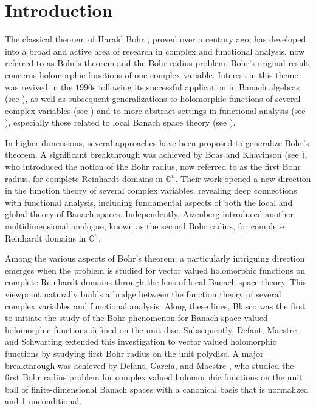 \documentclass[a4paper,11pt, reqno]{amsart}
\theoremstyle{definition}
\newcounter {own}
\begin{document}
	\section{Introduction}\label{section-1}
	The classical theorem of Harald Bohr \cite{Bohr-1914}, proved over a century ago, has developed into a broad and active area of research in complex and functional analysis, now referred to as Bohr’s theorem and the Bohr radius problem. Bohr's original result concerns holomorphic functions of one complex variable. Interest in this theme was revived in the $1990$s following its successful application in Banach algebras (see \cite{Dixon & BLMS & 1995}), as well as subsequent generalizations to holomorphic functions of several complex variables (see \cite{boas-1997,aizn-2000a}) and to more abstract settings in functional analysis (see \cite{aizn-2000b}), especially those related to local Banach space theory (see \cite{defant-2003}).
\vspace{1mm}

	In higher dimensions, several approaches have been proposed to generalize Bohr’s theorem. A significant breakthrough was achieved by Boas and Khavinson (see \cite{boas-1997}), who introduced the notion of the Bohr radius, now referred to as the first Bohr radius, for complete Reinhardt domains in 
	$\mathbb{C}^n$. Their work opened a new direction in the function theory of several complex variables, revealing deep connections with functional analysis, including fundamental aspects of both the local and global theory of Banach spaces. Independently, Aizenberg \cite{aizn-2000a} introduced another multidimensional analogue, known as the second Bohr radius, for complete Reinhardt domains in $\mathbb{C}^n$. 
	\par		
	Among the various aspects of Bohr's theorem, a particularly intriguing direction emerges when the problem is studied for vector valued holomorphic functions on complete Reinhardt domains through the lens of local Banach space theory. This viewpoint naturally builds a bridge between the function theory of several complex variables and functional analysis. Along these lines, Blasco \cite{Blasco-OTAA-2010,Blasco-Collect-2017} was the first to initiate the study of the Bohr phenomenon for Banach space valued holomorphic functions defined on the unit disc. Subsequently, Defant, Maestre, and Schwarting \cite{defant-2011} extended this investigation to vector valued holomorphic functions by studying first Bohr radius on the unit polydisc. A major breakthrough was achieved by Defant, Garc\'{i}a, and Maestre \cite{defant-2003}, who studied the first Bohr radius problem for complex valued holomorphic functions on the unit ball of finite-dimensional Banach spaces with a canonical basis that is normalized and 1-unconditional. 
	\vspace{1mm}
	
\end{document}
